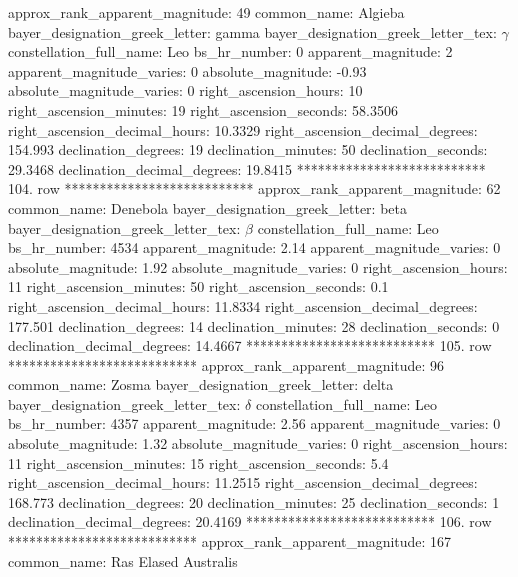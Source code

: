     approx_rank_apparent_magnitude: 49
                       common_name: Algieba
    bayer_designation_greek_letter: gamma
bayer_designation_greek_letter_tex: $\gamma$
           constellation_full_name: Leo
                      bs_hr_number: 0
                apparent_magnitude: 2
         apparent_magnitude_varies: 0
                absolute_magnitude: -0.93
         absolute_magnitude_varies: 0
             right_ascension_hours: 10
           right_ascension_minutes: 19
           right_ascension_seconds: 58.3506
     right_ascension_decimal_hours: 10.3329
   right_ascension_decimal_degrees: 154.993
               declination_degrees: 19
               declination_minutes: 50
               declination_seconds: 29.3468
       declination_decimal_degrees: 19.8415
*************************** 104. row ***************************
    approx_rank_apparent_magnitude: 62
                       common_name: Denebola
    bayer_designation_greek_letter: beta
bayer_designation_greek_letter_tex: $\beta$
           constellation_full_name: Leo
                      bs_hr_number: 4534
                apparent_magnitude: 2.14
         apparent_magnitude_varies: 0
                absolute_magnitude: 1.92
         absolute_magnitude_varies: 0
             right_ascension_hours: 11
           right_ascension_minutes: 50
           right_ascension_seconds: 0.1
     right_ascension_decimal_hours: 11.8334
   right_ascension_decimal_degrees: 177.501
               declination_degrees: 14
               declination_minutes: 28
               declination_seconds: 0
       declination_decimal_degrees: 14.4667
*************************** 105. row ***************************
    approx_rank_apparent_magnitude: 96
                       common_name: Zosma
    bayer_designation_greek_letter: delta
bayer_designation_greek_letter_tex: $\delta$
           constellation_full_name: Leo
                      bs_hr_number: 4357
                apparent_magnitude: 2.56
         apparent_magnitude_varies: 0
                absolute_magnitude: 1.32
         absolute_magnitude_varies: 0
             right_ascension_hours: 11
           right_ascension_minutes: 15
           right_ascension_seconds: 5.4
     right_ascension_decimal_hours: 11.2515
   right_ascension_decimal_degrees: 168.773
               declination_degrees: 20
               declination_minutes: 25
               declination_seconds: 1
       declination_decimal_degrees: 20.4169
*************************** 106. row ***************************
    approx_rank_apparent_magnitude: 167
                       common_name: Ras Elased Australis
